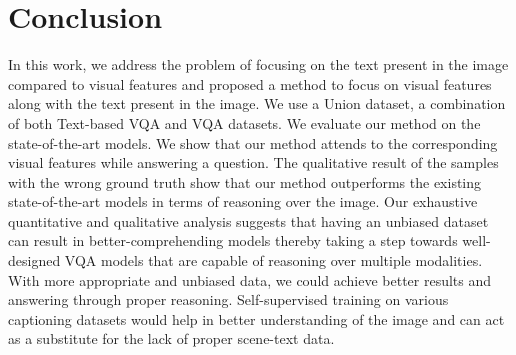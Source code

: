 \documentclass[10pt,twocolumn,letterpaper]{article}
\begin{document}
\section{Conclusion}
In this work, we address the problem of focusing on the text present in the image compared to visual features and proposed a method to focus on visual features along with the text present in the image. We use a Union dataset, a combination of both Text-based VQA and VQA datasets. We evaluate our method on the state-of-the-art models. We show that our method attends to the corresponding visual features while answering a question. The qualitative result of the samples with the wrong ground truth show that our method outperforms the existing state-of-the-art models in terms of reasoning over the image. Our exhaustive quantitative and qualitative analysis suggests that having an unbiased dataset can result in better-comprehending models thereby taking a step towards well-designed VQA models that are capable of reasoning over multiple modalities. With more appropriate and unbiased data, we could achieve better results and answering through proper reasoning. Self-supervised training on various captioning datasets would help in better understanding of the image and can act as a substitute for the lack of proper scene-text data.
\label{sec:conclusions}



\clearpage
{\small


}
\end{document}
